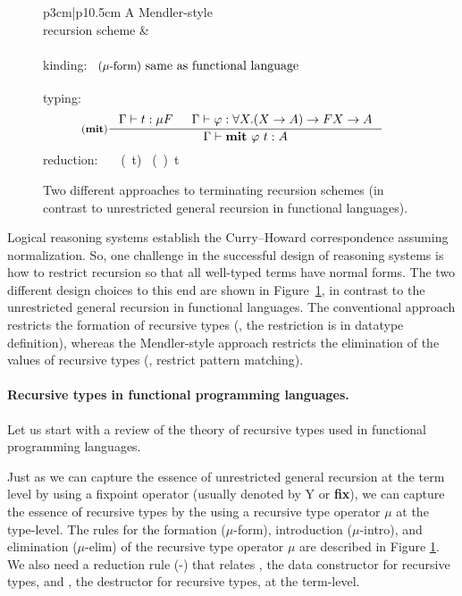 \begin{figure}
{\begin{tabular}{p{3cm}|p{10.5cm}}
\parbox{3cm}{A Mendler-style\\recursion scheme} &
\parbox{10.5cm}{
 kinding:~ $\text{{\small($\mu$-form)} same as functional language}
            \phantom{\frac{A^{A^{A^A}}}{A^{A^A}}}$
 \\
 typing:~
  \[\inference[(\MIt)]
     { \Gamma |- t : \mu F &
       \Gamma |- \varphi : \forall X . (X -> A) -> F X -> A}
     {\Gamma |- \MIt~\varphi~t : A} \]
 reduction:~
  \inference[(\MIt-\In)]
     {}
     {\MIt~\varphi~(\In~t) \rightsquigarrow \varphi~(\MIt~\varphi)~t}
}
\end{tabular} }
\caption{Two different approaches to terminating recursion schemes
      (in contrast to unrestricted general recursion in functional languages).}
\label{fig:approaches}
\end{figure}
Logical reasoning systems establish
the Curry--Howard correspondence assuming normalization.
So, one challenge in the successful design of reasoning systems
is how to restrict recursion so that all well-typed terms have normal forms.
The two different design choices to this end are shown
in Figure~\ref{fig:approaches}, in contrast to
the unrestricted general recursion in functional languages.
The conventional approach restricts the formation of recursive types
(\ie, the restriction is in datatype definition), whereas
the Mendler-style approach restricts the elimination of the values of
recursive types (\ie, restrict pattern matching).

\paragraph{Recursive types in functional programming languages.}
Let us start with a review of the theory of recursive types used
in functional programming languages.

Just as we can capture the essence of unrestricted general recursion
at the term level by using a fixpoint operator (usually denoted by \textsf{Y}
or \textbf{fix}), we can capture the essence of recursive types by the
using a recursive type operator $\mu$ at the type-level. 
The rules for the formation {\small($\mu$-form)},
introduction {\small($\mu$-intro)}, and elimination {\small($\mu$-elim)} of
the recursive type operator $\mu$ are described in Figure \ref{fig:approaches}.
We also need a reduction rule {\small(\unIn-\In)} that relates \In,
the data constructor for recursive types, and \unIn, the destructor for
recursive types, at the term-level.

